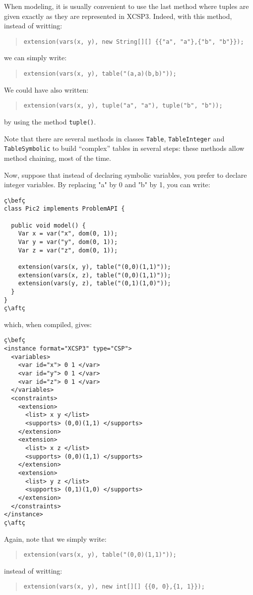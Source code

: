 \documentclass[10pt]{article}
\def\xt{{\rm XCSP3}\xspace}
\newcommand{\nn}[1]{{\tt #1}} %
\def\xt{{\rm XCSP3}\xspace}
\def\bef{\rule{10cm}{0.1mm}} %
\def\aft{\rule{10cm}{0.1mm}\medskip}
\begin{document}
When modeling, it is usually convenient to use the last method where tuples are given exactly as they are represented in \xt.
Indeed, with this method, instead of writting:
\begin{quote}
  \verb!extension(vars(x, y), new String[][] {{"a", "a"},{"b", "b"}});!
\end{quote}
we can simply write:
\begin{quote}
  \verb!extension(vars(x, y), table("(a,a)(b,b)"));!
\end{quote}

We could have also written:
\begin{quote}
  \verb!extension(vars(x, y), tuple("a", "a"), tuple("b", "b"));!
\end{quote}
by using the method \nn{tuple()}.

  
Note that there are several methods in classes \nn{Table}, \nn{TableInteger} and \nn{TableSymbolic} to build ``complex'' tables in several steps: these methods allow method chaining, most of the time.

Now, suppose that instead of declaring symbolic variables, you prefer to declare integer variables.
By replacing "a" by 0 and "b" by 1, you can write:

\begin{lstlisting}
ç\befç
class Pic2 implements ProblemAPI {
  
  public void model() {
    Var x = var("x", dom(0, 1));
    Var y = var("y", dom(0, 1));
    Var z = var("z", dom(0, 1));
    
    extension(vars(x, y), table("(0,0)(1,1)"));
    extension(vars(x, z), table("(0,0)(1,1)"));
    extension(vars(y, z), table("(0,1)(1,0)"));
  }
}
ç\aftç
\end{lstlisting}
which, when compiled, gives:
\begin{lstlisting}
ç\befç
<instance format="XCSP3" type="CSP">
  <variables>
    <var id="x"> 0 1 </var>
    <var id="y"> 0 1 </var>
    <var id="z"> 0 1 </var>
  </variables>
  <constraints>
    <extension>
      <list> x y </list>
      <supports> (0,0)(1,1) </supports>
    </extension>
    <extension>
      <list> x z </list>
      <supports> (0,0)(1,1) </supports>
    </extension>
    <extension>
      <list> y z </list>
      <supports> (0,1)(1,0) </supports>
    </extension>
  </constraints>
</instance>
ç\aftç
\end{lstlisting}


Again, note that we simply write:
\begin{quote}
  \verb!extension(vars(x, y), table("(0,0)(1,1)"));!
\end{quote}
instead of writting:
\begin{quote}
  \verb!extension(vars(x, y), new int[][] {{0, 0},{1, 1}});!
\end{quote}
\end{document}

